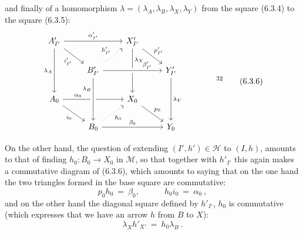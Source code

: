 \documentclass[11pt]{article}
\newcommand{\printedpage}[1]{\marginpar{\footnotesize p.~#1}}
\newcommand{\msp}[1]{\marginpar{\footnotesize [#1]}}
\begin{document}
and finally of a homomorphism $\lambda = (\lambda_A, \lambda_B, \lambda_X, \lambda_Y)$ from the square (6.3.4) to the square (6.3.5):
\printedpage{56}\msp{page 112}
\[
\begin{tikzcd}
A'_{I'} \arrow[rr, "\alpha'_{I'}"] \arrow[dr, "i'_{I'}"'] \arrow[dd, "\lambda_A"'] & & X'_{I'} \arrow[dr, "p'_{I'}"] \arrow[dd, "\lambda_X" near start] & \\
 & B'_{I'} \arrow[ur, dotted, "h'_{I'}"] \arrow[rr, crossing over, "\beta'_{I'}" near end] & & Y'_{I'} \arrow[dd, "\lambda_Y"] \\
A_0 \arrow[rr, "\alpha_0" near start] \arrow[dr, "i_0"'] & & X_0 \arrow[dr, "p_0"] & \\
 & B_0 \arrow[from=2-2, crossing over, "\lambda_B"' near start] \arrow[ur, dotted, "h_0"'] \arrow[rr, "\beta_0"] & & Y_0
\end{tikzcd}
\qquad\qquad \text{\footnotemark[32]}
\tag*{(6.3.6)}
\]

On the other hand, the question of extending $(I', h') \in \mathcal{H}$ to $(I, h)$, amounts to that of finding $h_0 : B_0 \longrightarrow X_0$ in $\mathcal{M}$, so that together with $h'_{I'}$ this again makes a commutative diagram of (6.3.6), which amounts to saying that on the one hand the two triangles formed in the base square are commutative:
\[
p_0h_0 \ =\ \beta_0, \qquad\quad h_0i_0 \ =\ \alpha_0\ ,
\tag*{(6.3.7)}
\]
and on the other hand the diagonal square defined by $h'_{I'}$, $h_0$ is commutative (which expresses that we have an arrow $h$ from $B$ to $X$):
\[
\lambda_X h'_{X'} \ =\ h_0\lambda_B\ . %
\tag*{(6.3.8)}
\]
\end{document}
